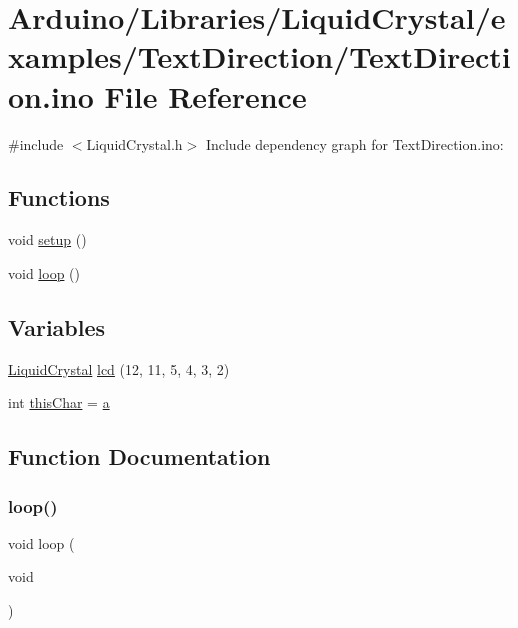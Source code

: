 \hypertarget{_text_direction_8ino}{}\section{Arduino/\+Libraries/\+Liquid\+Crystal/examples/\+Text\+Direction/\+Text\+Direction.ino File Reference}
\label{_text_direction_8ino}
{\ttfamily \#include $<$Liquid\+Crystal.\+h$>$}\newline
Include dependency graph for Text\+Direction.\+ino\+:
\subsection*{Functions}
\begin{DoxyCompactItemize}
\item 
void \hyperlink{_text_direction_8ino_a4fc01d736fe50cf5b977f755b675f11d}{setup} ()
\item 
void \hyperlink{_text_direction_8ino_afe461d27b9c48d5921c00d521181f12f}{loop} ()
\end{DoxyCompactItemize}
\subsection*{Variables}
\begin{DoxyCompactItemize}
\item 
\hyperlink{class_liquid_crystal}{Liquid\+Crystal} \hyperlink{_text_direction_8ino_a7226623e632d4109904c86009c9f3b60}{lcd} (12, 11, 5, 4, 3, 2)
\item 
int \hyperlink{_text_direction_8ino_aac662bcdf940f82df2d946f53ca61481}{this\+Char} = \textquotesingle{}\hyperlink{_w_s_8ino_aa4c2a5552e9bc49b1816ff532f558c74}{a}\textquotesingle{}
\end{DoxyCompactItemize}


\subsection{Function Documentation}
\mbox{\label{_text_direction_8ino_afe461d27b9c48d5921c00d521181f12f}} 
\subsubsection{\texorpdfstring{loop()}{loop()}}
{\footnotesize\ttfamily void loop (\begin{DoxyParamCaption}\item[{void}]{ }\end{DoxyParamCaption})}

